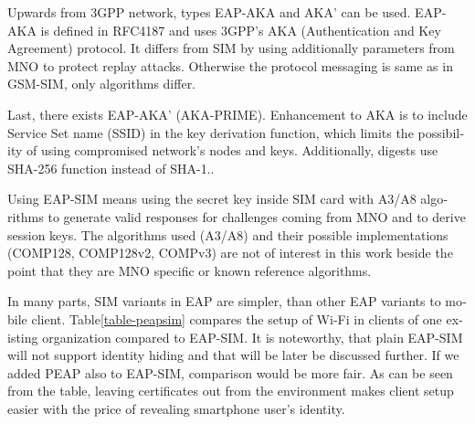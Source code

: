 \documentclass[12pt,a4paper,english]{tutthesis}
\begin{document}
\begin{otherlanguage}{english}
Upwards from 3GPP network, types EAP-AKA and AKA' can be used.
EAP-AKA is defined in RFC4187 \cite{rfc4187} and
 uses 3GPP's AKA (Authentication and Key Agreement) protocol.
It differs from SIM by using additionally parameters from MNO to
protect replay attacks. Otherwise the protocol messaging is same
as in  GSM-SIM, only algorithms differ.


Last, there exists EAP-AKA' (AKA-PRIME).
Enhancement to AKA is to include Service Set name (SSID) 
in the key derivation function, which limits the possibility of using
compromised network's nodes and keys. Additionally, digests use SHA-256
function instead of SHA-1.\cite{rfc5448}.


  Using EAP-SIM means using the secret key inside SIM card with A3/A8
algorithms to generate valid responses for challenges coming from MNO
and to derive session keys.  The algorithms used (A3/A8) and their
possible implementations (COMP128, COMP128v2, COMPv3) are not of
interest in this work beside the point that they are MNO specific or known reference algorithms.



In many parts, SIM variants in EAP are simpler, than other EAP
variants to mobile client.  Table\ref{table-peapsim} compares the setup of Wi-Fi
in clients of one existing organization compared to EAP-SIM. It
is noteworthy, that plain EAP-SIM will not support identity hiding and
that will be later be discussed further. If we added PEAP \cite{peap}
also to EAP-SIM, comparison would be more fair.
As can be seen from the table, leaving certificates out from the environment
makes client setup easier with the price of revealing smartphone user's
identity.  




\end{otherlanguage}
\end{document}
